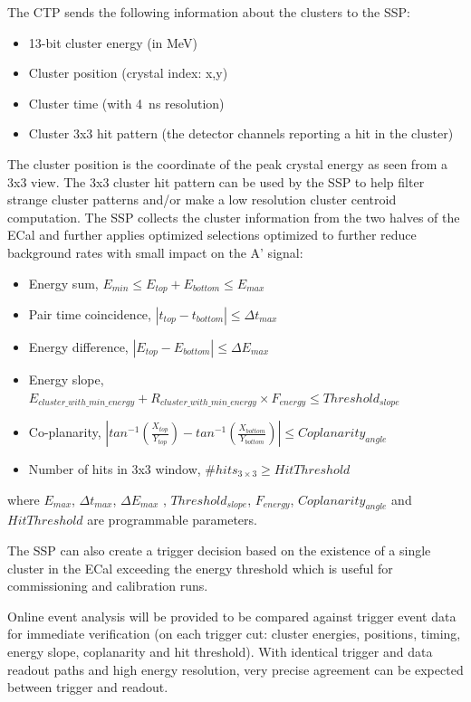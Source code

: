 The CTP sends the following information about the clusters to the SSP:
\begin{itemize}
\item 13-bit cluster energy (in MeV)
\item Cluster position (crystal index: x,y)
\item Cluster time (with 4~ns resolution)
\item Cluster 3x3 hit pattern (the detector channels reporting a hit in the cluster)
\end{itemize}
The cluster position is the coordinate of the peak crystal energy as seen from a 3x3 view. The 3x3 cluster hit pattern can be used by the SSP to help filter strange cluster patterns and/or make a low resolution cluster centroid computation.
The SSP collects the cluster information from the two halves of the ECal and further applies optimized selections optimized to further reduce background rates with small impact on the A' signal:
\begin{itemize}
\item Energy sum,  
$E_{min}\le E_{top}+E_{bottom}\le E_{max}$
\item Pair time coincidence, 
$|t_{top}-t_{bottom}|\le \Delta t_{max}$ 
\item Energy difference, 
$|E_{top}-E_{bottom}|\le \Delta E_{max}$ 
\item Energy slope,
$E_{cluster\_with\_min\_energy}+R_{cluster\_with\_min\_energy}\times F_{energy}\le Threshold_{slope}$
\item Co-planarity, 
$|
tan^{-1}(\frac{X_{top}}{Y_{top}})-
tan^{-1}(\frac{X_{bottom}}{Y_{bottom}}) |\le Coplanarity_{angle}$
\item Number of hits in 3x3 window, 
\#$hits_{3\times 3}\ge HitThreshold$
\end{itemize}
\noindent
where $ E_{max}$,  $\Delta t_{max}$, $ \Delta E_{max}$ , $Threshold_{slope}$, 
$F_{energy}$, $Coplanarity_{angle}$
and
$HitThreshold$ are programmable parameters.

The SSP can also create a trigger decision based on the existence of a single cluster in the ECal exceeding the energy threshold which is  useful for commissioning and calibration runs. 

Online event analysis will be provided to be compared against trigger event data for immediate verification (on each trigger cut: cluster energies, positions, timing, energy slope, coplanarity and hit threshold). With identical trigger and data readout paths and high energy resolution, very precise agreement can be expected between trigger and readout.


